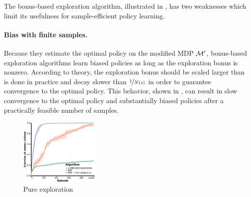 The bonus-based exploration algorithm, illustrated in , has two weaknesses which limit its usefulness for sample-efficient policy learning.


\paragraph{Bias with finite samples.}
Because they estimate the optimal policy on the modified MDP $\mathcal{M}'$, bonus-based exploration algorithms learn biased policies as long as the exploration bonus is nonzero.
According to theory, the exploration bonus should be scaled larger than is done in practice \citep{strehl2008analysis} and decay slower than $\nicefrac{1}{N(s)}$ \citep{Kolter2009NearBayesianEI} in order to guarantee convergence to the optimal policy.
This behavior, shown in , can result in slow convergence to the optimal policy and substantially biased policies after a practically feasible number of samples.

\begin{figure}[h]
    \begin{center}
        \includegraphics[width=0.35\textwidth]{figures/deep/grid40_visits_neurips.pdf}
    \end{center}
    \caption{Pure exploration}
    \label{fig:gridworld_visits}
\end{figure}




